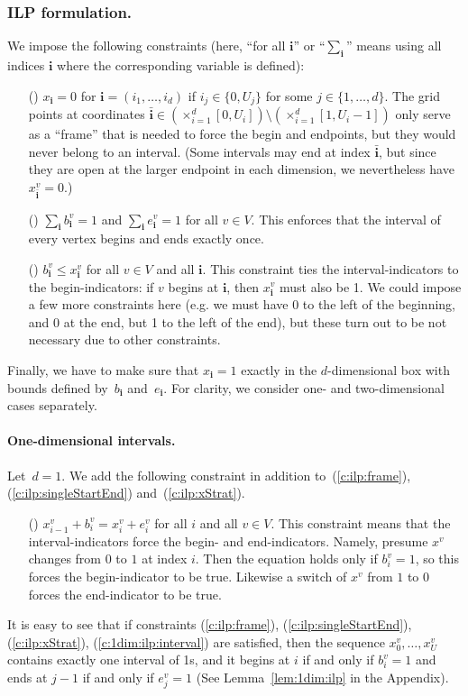 \documentclass[runningheads]{llncs}
\newcommand{\bvec}[1]{\mathbf{#1}}
\newcounter{constr}
\newcommand{\constr}[1]{\noindent \refstepcounter{constr}\theconstr #1}
\begin{document}
\subsubsection{ILP formulation.}
\label{se:1dim:ilp}
We impose the following constraints (here, ``for all $\bvec{i}$'' or ``$\sum_\bvec{i}$'' 
means using all indices $\bvec{i}$  where the corresponding variable is defined): 
\begin{itemize}
\item[(\constr{\label{c:ilp:frame}})] 
	$x_\bvec{i} = 0$ for $\bvec{i} = ( i_1, \ldots, i_d )$
	if $i_j \in \{ 0, U_j\}$ for some $j \in \{ 1, \ldots, d\}$.
	The grid points at coordinates
	$\bvec{\bar{i}} \in (\times_{i=1}^d [ 0, U_i]) 
	\setminus (\times_{i=1}^d [ 1, U_i -1])$ 
	only serve as a ``frame'' that is needed
	to force the begin and endpoints, but they would never belong
	to an interval.  (Some intervals may end at index $\bvec{\bar{i}}$, but
	since they are open at the larger endpoint in each dimension, we nevertheless
	have $x_\bvec{\bar{i}}^v=0$.)
\item[(\constr{\label{c:ilp:singleStartEnd}})] 
	$\sum_\bvec{i} b_\bvec{i}^v = 1$ and $\sum_\bvec{i} e_\bvec{i}^v=1$
	 for all $v\in V$.
	This enforces that the interval of every vertex 
	begins and ends exactly once.
\item[(\constr{\label{c:ilp:xStrat}})] 
	$b_\bvec{i}^v \leq x_\bvec{i}^v$ for all $v\in V$ and all $\bvec{i}$.
	This constraint ties the interval-indicators to the begin-indicators:
	if $v$ begins at $\bvec{i}$, then $x_\bvec{i}^v$ must also be 1.  We could
	impose a few more constraints here (e.g. we must have 0 to the
	left of the beginning, and 0 at the end, but 1 to the left of
	the end), but these turn out to be not necessary due to other
	constraints.	
\end{itemize}
Finally, we have to make sure that $x_\bvec{i} = 1$
exactly in the $d$-dimensional box with bounds defined by~$b_\bvec{i}$
and~$e_\bvec{i}$. For clarity, we consider one- 
and two-dimensional cases separately.
\paragraph*{One-dimensional intervals.}
Let~$d=1$. We add the following constraint
in addition to~(\ref{c:ilp:frame}), (\ref{c:ilp:singleStartEnd})
and~(\ref{c:ilp:xStrat}).
\begin{itemize}
  \item[(\constr{\label{c:1dim:ilp:interval}})] 
	$x_{i-1}^v + b_i^v = x_i^v + e_{i}^v$ for all $i$
	and all $v\in V$.  This constraint means that the
	interval-indicators force the begin- and end-indicators.
	Namely, presume $x^v$ changes from $0$ to $1$ at index $i$.  
	Then the equation holds only if
	$b_i^v=1$, so this forces the begin-indicator to be true.
	Likewise a switch of $x^v$ from $1$ to $0$ forces the end-indicator
	to be true.
\end{itemize}
It is easy to see that if constraints
(\ref{c:ilp:frame}), (\ref{c:ilp:singleStartEnd}),
(\ref{c:ilp:xStrat}), (\ref{c:1dim:ilp:interval})
 are satisfied, then the sequence
$x_0^v,\dots,x_U^v$ contains exactly one interval of 1s,
and it begins at $i$ if and only if $b_i^v=1$ and
ends at $j-1$ if and only if $e_j^v=1$ 
(See Lemma~\ref{lem:1dim:ilp} in the Appendix).
\end{document}

